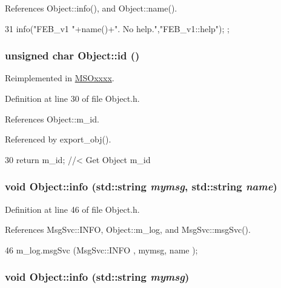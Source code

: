 References Object::info(), and Object::name().


\begin{DoxyCode}
31 { info("FEB_v1 "+name()+". No help.","FEB_v1::help"); };
\end{DoxyCode}
\hypertarget{classObject_af99145335cc61ff6e2798ea17db009d2}{
\subsubsection[{id}]{\setlength{\rightskip}{0pt plus 5cm}unsigned char Object::id ()}}
\label{classObject_af99145335cc61ff6e2798ea17db009d2}


Reimplemented in \hyperlink{classMSOxxxx_a0f14b23d31d8e7647184e99a89600cc3}{MSOxxxx}.

Definition at line 30 of file Object.h.

References Object::m\_\-id.

Referenced by export\_\-obj().


\begin{DoxyCode}
30 { return m_id;         } //< Get Object m_id 
\end{DoxyCode}
\hypertarget{classObject_a1ca123253dfd30fc28b156f521dcbdae}{
\subsubsection[{info}]{\setlength{\rightskip}{0pt plus 5cm}void Object::info (std::string {\em mymsg}, \/  std::string {\em name})}}
\label{classObject_a1ca123253dfd30fc28b156f521dcbdae}


Definition at line 46 of file Object.h.

References MsgSvc::INFO, Object::m\_\-log, and MsgSvc::msgSvc().


\begin{DoxyCode}
46 { m_log.msgSvc (MsgSvc::INFO    , mymsg, name ); }
\end{DoxyCode}
\hypertarget{classObject_a644fd329ea4cb85f54fa6846484b84a8}{
\subsubsection[{info}]{\setlength{\rightskip}{0pt plus 5cm}void Object::info (std::string {\em mymsg})}}
\label{classObject_a644fd329ea4cb85f54fa6846484b84a8}


